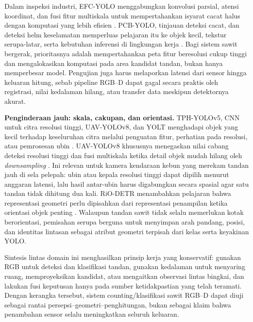 Dalam inspeksi industri, EFC-YOLO menggabungkan konvolusi parsial, atensi
koordinat, dan fusi fitur multiskala untuk mempertahankan isyarat cacat
halus dengan komputasi yang lebih efisien \cite{yang2023efcyolo}. PCB-YOLO,
tinjauan deteksi cacat, dan deteksi helm keselamatan memperluas pelajaran itu
ke objek kecil, tekstur serupa-latar, serta kebutuhan inferensi di lingkungan
kerja \cite{tang2024pcbyolo,jha2023defectreview,zhou2021helmet}. Bagi sistem
sawit bergerak, prioritasnya adalah mempertahankan peta fitur beresolusi
cukup tinggi dan mengalokasikan komputasi pada area kandidat tandan, bukan
hanya memperbesar model. Pengujian juga harus melaporkan latensi dari sensor
hingga keluaran hitung, sebab pipeline RGB--D dapat gagal secara praktis oleh
registrasi, nilai kedalaman hilang, atau transfer data meskipun detektornya
akurat.

\textbf{Penginderaan jauh: skala, cakupan, dan orientasi.} TPH-YOLOv5,
CNN untuk citra resolusi tinggi, UAV-YOLOv8, dan YOLT menghadapi objek yang
kecil terhadap keseluruhan citra melalui penguatan fitur, perhatian pada
resolusi, atau pemrosesan ubin \cite{zhu2021tphyolov5,zhang2019remotesensing,wang2023uavyolo,vanetten2018yolt}.
UAV-YOLOv8 khususnya menegaskan nilai cabang deteksi resolusi tinggi dan
fusi multiskala ketika detail objek mudah hilang oleh \textit{downsampling}
\cite{wang2023uavyolo}. Ini relevan untuk kamera kendaraan kebun yang
merekam tandan jauh di sela pelepah: ubin atau kepala resolusi tinggi dapat
dipilih menurut anggaran latensi, lalu hasil antar-ubin harus digabungkan
secara spasial agar satu tandan tidak dihitung dua kali. RiO-DETR menambahkan
pelajaran bahwa representasi geometri perlu dipisahkan dari representasi
penampilan ketika orientasi objek penting \cite{hu2026riodetr}. Walaupun
tandan sawit tidak selalu memerlukan kotak berorientasi, pemisahan serupa
berguna untuk menyimpan arah pandang, posisi, dan identitas lintasan sebagai
atribut geometri terpisah dari kelas serta keyakinan YOLO.

Sintesis lintas domain ini menghasilkan prinsip kerja yang konservatif:
gunakan RGB untuk deteksi dan klasifikasi tandan, gunakan kedalaman untuk
menyaring ruang, memproyeksikan kandidat, atau mengaitkan observasi lintas
bingkai, dan lakukan fusi keputusan hanya pada sumber ketidakpastian yang
telah teramati. Dengan kerangka tersebut, sistem counting/klasifikasi sawit
RGB--D dapat diuji sebagai rantai persepsi--geometri--penghitungan, bukan
sebagai klaim bahwa penambahan sensor selalu meningkatkan seluruh keluaran.


